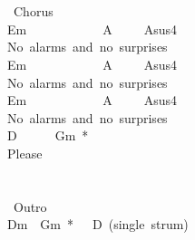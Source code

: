 {\\
\\
\lbrack\ Chorus\rbrack\\
Em\ \ \ \ \ \ \ \ \ \ \ \ A\ \ \ \ \ Asus4\\
No\ alarms\ and\ no\ surprises\\
Em\ \ \ \ \ \ \ \ \ \ \ \ A\ \ \ \ \ Asus4\\
No\ alarms\ and\ no\ surprises\\
Em\ \ \ \ \ \ \ \ \ \ \ \ A\ \ \ \ \ Asus4\\
No\ alarms\ and\ no\ surprises\\
D\ \ \ \ \ \ Gm\ *\\
Please\\
\\
\\
\lbrack\ Outro\rbrack\\
Dm\ \ Gm\ *\ \ \ D\ (single\ strum)}
